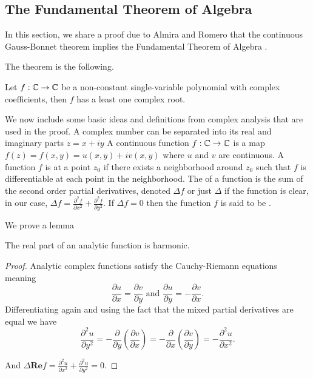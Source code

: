 \subsection{The Fundamental Theorem of Algebra}
\label{sec:fta}

In this section, we share a proof due to Almira and Romero that
the continuous Gauss-Bonnet theorem implies the
Fundamental Theorem of Algebra \cite{almira_yet_2007}.

The theorem is the following.
\begin{theorem}\label{thm:fta}
	Let $f:\mathbb{C} \to \mathbb{C}$ be a non-constant single-variable polynomial with complex coefficients,
	then $f$ has a least one complex root.
\end{theorem}

We now include some basic ideas and definitions from complex analysis that are used
in the proof. A complex number can be separated into its real and imaginary parts $z=x+iy$
A continuous function $f:\mathbb{C}\to \mathbb{C}$ is a map $f(z)=f(x,y)=u(x,y)+iv(x,y)$ where $u$ and $v$ are continuous.
A function $f$ is  at a point $z_0$ if there exists a neighborhood around $z_0$ 
such that $f$ is differentiable at each point in the neighborhood.
The  of a function is the sum of the second order partial derivatives, denoted $\Delta f$
or just $\Delta$ if the function is clear,
in our case, $\Delta f=\frac{\partial^2 f}{\partial x^2}+\frac{\partial^2 f}{\partial y^2}$.
If $\Delta f=0$ then the function $f$ is said to be .

We prove a lemma
\begin{lemma}\label{lem:anal-harmonic}
	The real part of an analytic function is harmonic.
\end{lemma}
\begin{proof}
	Analytic complex functions satisfy the Cauchy-Riemann equations meaning
	$$\frac{\partial u}{\partial x}=\frac{\partial v}{\partial y} \textrm{ and } \frac{\partial u}{\partial y}=- \frac{\partial v}		{\partial x}.$$
	Differentiating again and using the fact that the mixed partial derivatives are equal
	we have
	$$\frac{\partial^2 u}{\partial y^2}=-\frac{\partial}{\partial y}\left(\frac{\partial v}{\partial x}\right)
	=-\frac{\partial}{\partial x}\left(\frac{\partial v}{\partial y}\right)=-\frac{\partial^2 u}{\partial x^2}.$$

	And $\Delta \textbf{Re}f=\frac{\partial^2 u}{\partial x^2}+\frac{\partial^2 u}{\partial y^2}=0$.
\end{proof}

